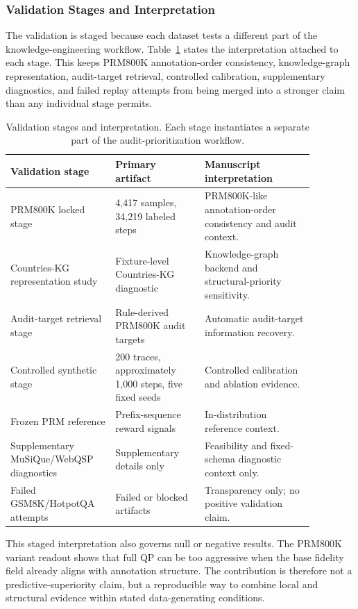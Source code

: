 \documentclass[a4paper,fleqn]{cas-sc}
\begin{document}
\subsubsection{Validation Stages and Interpretation}

The validation is staged because each dataset tests a different part of the knowledge-engineering workflow. Table~\ref{tab:evidence-routes} states the interpretation attached to each stage. This keeps PRM800K annotation-order consistency, knowledge-graph representation, audit-target retrieval, controlled calibration, supplementary diagnostics, and failed replay attempts from being merged into a stronger claim than any individual stage permits.

\begin{table}[ht]
\caption{Validation stages and interpretation. Each stage instantiates a separate part of the audit-prioritization workflow.}
\label{tab:evidence-routes}
\centering
\small
\renewcommand{\arraystretch}{1.12}
\begin{tabular}{p{0.29\linewidth}p{0.26\linewidth}p{0.32\linewidth}}
\toprule
\textbf{Validation stage} & \textbf{Primary artifact} & \textbf{Manuscript interpretation} \\
\midrule
PRM800K locked stage & 4,417 samples, 34,219 labeled steps & PRM800K-like annotation-order consistency and audit context. \\
Countries-KG representation study & Fixture-level Countries-KG diagnostic & Knowledge-graph backend and structural-priority sensitivity. \\
Audit-target retrieval stage & Rule-derived PRM800K audit targets & Automatic audit-target information recovery. \\
Controlled synthetic stage & 200 traces, approximately 1,000 steps, five fixed seeds & Controlled calibration and ablation evidence. \\
Frozen PRM reference & Prefix-sequence reward signals & In-distribution reference context. \\
Supplementary MuSiQue/WebQSP diagnostics & Supplementary details only & Feasibility and fixed-schema diagnostic context only. \\
Failed GSM8K/HotpotQA attempts & Failed or blocked artifacts & Transparency only; no positive validation claim. \\
\bottomrule
\end{tabular}
\end{table}

This staged interpretation also governs null or negative results. The PRM800K variant readout shows that full QP can be too aggressive when the base fidelity field already aligns with annotation structure. The contribution is therefore not a predictive-superiority claim, but a reproducible way to combine local and structural evidence within stated data-generating conditions.
\end{document}
